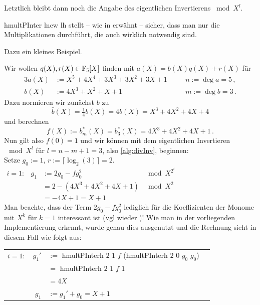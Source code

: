 
Letztlich bleibt dann noch die Angabe des eigentlichen Invertierens $\bmod
X^l$.


ħmultPInter lnew lħ stellt -- wie in  erwähnt -- sicher, dass 
man nur die Multiplikationen durchführt, die auch wirklich notwendig sind.

Dazu ein kleines Beispiel.

\begin{beispiel}
  Wir wollen $q(X),r(X)\in \mathbb{F}_5[X]$ finden mit
  $a(X) = b(X) q(X) + r(X)$ für 
  \begin{alignat*}{3}
    a(X) &:= X^5 + 4X^4 + 3 X^3 + 3 X^2 + 3 X + 1 &&\quad n:= \deg a = 5\,,\\
    b(X) &:= 4 X^3 + X^2 + X + 1 &&\quad m := \deg b = 3\,.
  \end{alignat*}
  Dazu normieren wir zunächst $b$ zu 
  \[ \bar b(X) = \tfrac{1}{4} b(X) = 4 b(X) = X^3 + 4 X^2 +4X +4\]
  und berechnen 
  \[ f(X) := b^\ast_m(X) = b^\ast_3(X) = 4X^3 + 4X^2 + 4X + 1\,.\]
  Nun gilt also $f(0) = 1$ und wir können mit dem eigentlichen Invertieren
  $\mod X^l$ für $ l = n-m+1 = 3$, also \autoref{alg:divInv}, beginnen:\\
  Setze $g_0 := 1$, $r := \lceil \log_2(3)\rceil = 2$.\\
  $\begin{array}{lrll}
    i=1: & g_1 & := 2g_0 - fg_0^2 & \bmod X^{2^i}\\
              && = 2 - (4X^3+4X^2+4X+1) &\bmod X^2 \\
              && = -4X +1 = X+1
  \end{array}$\\
  Man beachte, dass der Term $2g_0 - fg_0^2$ lediglich für die Koeffizienten
  der Monome mit $X^k$ für $k=1$ interessant ist (vgl wieder 
  )! Wie man in der vorliegenden Implementierung erkennt,
  wurde genau dies ausgenutzt und die Rechnung sieht in diesem Fall wie folgt
  aus:\\
  \begin{tabular}{lrll}
    $i=1:$ & $g_1'$&$:=$ ħmultPInterħ $2$ $1$ $f$ (ħmultPInterħ $2$ $0$ $g_0$ $g_0$)\\
            &&$=$ ħmultPInterħ $2$ $1$ $f$ $1$\\
            &&$= 4X$\\
        & $g_1$&$:= g_1' + g_0 = X+1$

\end{tabular}
\end{beispiel}
